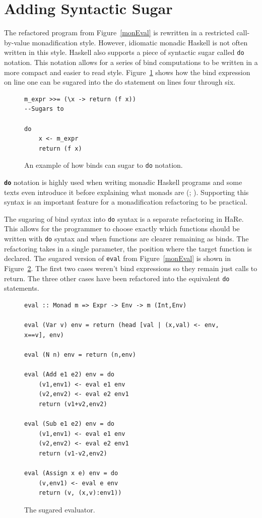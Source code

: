 \section{Adding Syntactic Sugar}

The refactored program from Figure~\ref{monEval} is rewritten in a restricted call-by-value monadification style. However, idiomatic monadic Haskell is not often written in this style. Haskell also supports a piece of syntactic sugar called \texttt{do} notation. This notation allows for a series of bind computations to be written in a more compact and easier to read style. Figure~\ref{doEx} shows how the bind expression on line one can be sugared into the do statement on lines four through six.

\begin{figure}[t]
\begin{lstlisting}
m_expr >>= (\x -> return (f x))
--Sugars to

do
	x <- m_expr
	return (f x)
\end{lstlisting}
\caption{An example of how binds can sugar to \texttt{do} notation.}
\label{doEx}
\end{figure}

\textbf{\texttt{do}} notation is highly used when writing monadic Haskell programs and some texts even introduce it before explaining what monads are (\cite{realWorldHaskell}; \cite{learnYou}). Supporting this syntax is an important feature for a monadification refactoring to be practical. 

The sugaring of bind syntax into \texttt{do} syntax is a separate refactoring in HaRe. This allows for the programmer to choose exactly which functions should be written with \texttt{do} syntax and when functions are clearer remaining as binds. The refactoring takes in a single parameter, the position where the target function is declared. The sugared version of \texttt{eval} from Figure~\ref{monEval} is shown in Figure~\ref{finEval}. The first two cases weren't bind expressions so they remain just calls to return. The three other cases have been refactored into the equivalent \texttt{do} statements.

\begin{figure}[t]
\begin{lstlisting}
eval :: Monad m => Expr -> Env -> m (Int,Env)

eval (Var v) env = return (head [val | (x,val) <- env, x==v], env)

eval (N n) env = return (n,env)

eval (Add e1 e2) env = do
	(v1,env1) <- eval e1 env
	(v2,env2) <- eval e2 env1
	return (v1+v2,env2)

eval (Sub e1 e2) env = do
	(v1,env1) <- eval e1 env 
	(v2,env2) <- eval e2 env1
	return (v1-v2,env2)

eval (Assign x e) env = do
	(v,env1) <- eval e env
	return (v, (x,v):env1))
\end{lstlisting}
\caption{The sugared evaluator.}
\label{finEval}
\end{figure}

